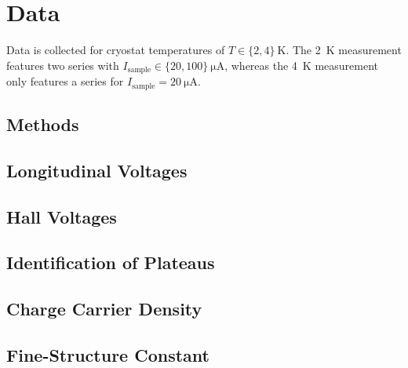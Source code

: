 \chapter{Data}
Data is collected for cryostat temperatures of $T\in\{ 2,4\}\ \si{\kelvin}$.
The \SI{2}{\kelvin} measurement features two series with $I_\text{sample}\in\{ 20,100\}\ \si{\micro\ampere}$, whereas the \SI{4}{\kelvin} measurement only features a series for $I_\text{sample}=\SI{20}{\micro\ampere}$.

\section{Methods} %

\section{Longitudinal Voltages} %

\section{Hall Voltages} %

\section{Identification of Plateaus} %

\section{Charge Carrier Density} %

\section{Fine-Structure Constant} %
